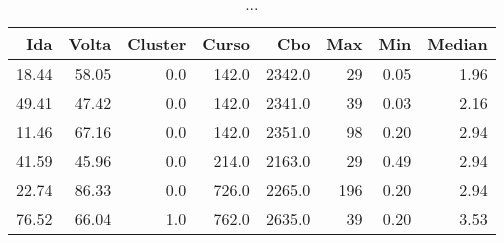 \begin{table}
\centering
\caption{...}
\label{tab:Salarios_Desequlibrio_M}
\begin{tabular}{rrrrrrrr}
\toprule
  Ida &  Volta &  Cluster &  Curso &    Cbo &  Max &  Min &  Median \\
\midrule
18.44 &  58.05 &      0.0 &  142.0 & 2342.0 &   29 & 0.05 &    1.96 \\
49.41 &  47.42 &      0.0 &  142.0 & 2341.0 &   39 & 0.03 &    2.16 \\
11.46 &  67.16 &      0.0 &  142.0 & 2351.0 &   98 & 0.20 &    2.94 \\
41.59 &  45.96 &      0.0 &  214.0 & 2163.0 &   29 & 0.49 &    2.94 \\
22.74 &  86.33 &      0.0 &  726.0 & 2265.0 &  196 & 0.20 &    2.94 \\
76.52 &  66.04 &      1.0 &  762.0 & 2635.0 &   39 & 0.20 &    3.53 \\
\bottomrule
\end{tabular}
\end{table}
